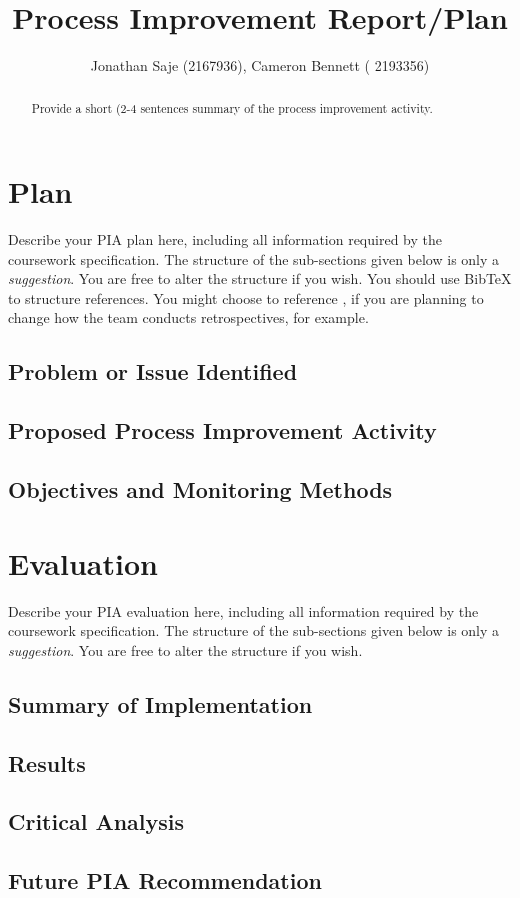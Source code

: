 \documentclass[11pt]{article}
\begin{document}
\title{Process Improvement Report/Plan}

\author{Jonathan Saje (2167936), Cameron Bennett ( 2193356)}

\maketitle

\begin{abstract}
  Provide a short (2-4 sentences summary of the process improvement activity.
\end{abstract}

\section*{Plan}

Describe your PIA plan here, including all information required by the coursework specification.  The structure of the
sub-sections given below is only a \emph{suggestion}.  You are free to alter the structure if you wish.  You should use
BibTeX to structure references.  You might choose to reference \citet{schwaber01agile}, if you are planning to change
how the team conducts retrospectives, for example.

\subsection*{Problem or Issue Identified}

\subsection*{Proposed Process Improvement Activity}

\subsection*{Objectives and Monitoring Methods}

\section*{Evaluation}

Describe your PIA evaluation here, including all information required by the coursework specification.  The structure of
the sub-sections given below is only a \emph{suggestion}.  You are free to alter the structure if you wish.

\subsection*{Summary of Implementation}

\subsection*{Results}

\subsection*{Critical Analysis}

\subsection*{Future PIA Recommendation}



\end{document}
